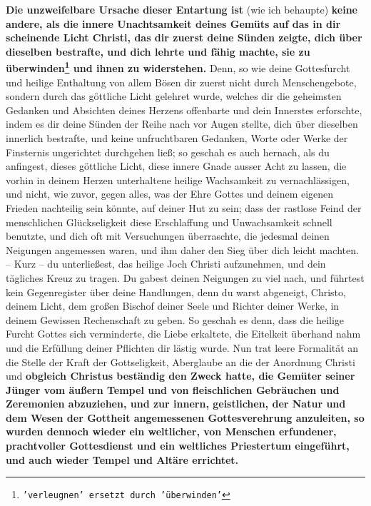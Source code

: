 \label{ref:02_08_ursache_des_abfalls}
\textbf{Die unzweifelbare Ursache dieser Entartung ist} (wie ich behaupte)
\textbf{keine andere,
als die innere Unachtsamkeit deines Gemüts auf das in dir scheinende Licht
Christi, das dir zuerst deine Sünden zeigte, dich über dieselben bestrafte, und
dich lehrte und fähig machte, sie zu überwinden\footnote{\texttt{'verleugnen'
ersetzt durch 'überwinden'}}
und ihnen zu widerstehen.} Denn,
so wie deine Gottesfurcht und heilige Enthaltung von allem Bösen dir zuerst
nicht durch Menschengebote, sondern durch das göttliche Licht gelehret wurde,
welches dir die geheimsten Gedanken und Absichten deines Herzens offenbarte und
dein Innerstes erforschte, indem es dir deine Sünden der Reihe nach vor Augen
stellte, dich über dieselben innerlich bestrafte, und keine unfruchtbaren
Gedanken, Worte oder Werke der Finsternis ungerichtet durchgehen ließ; so
geschah es auch hernach, als du anfingest, dieses göttliche Licht, diese innere
Gnade ausser Acht zu lassen, die vorhin in deinem Herzen unterhaltene heilige
Wachsamkeit zu vernachlässigen, und nicht, wie zuvor, gegen alles, was der Ehre
Gottes und deinem eigenen Frieden nachteilig sein könnte, auf deiner Hut zu
sein; dass der rastlose Feind der menschlichen Glückseligkeit diese
Erschlaffung und Unwachsamkeit schnell benutzte, und dich oft mit Versuchungen
überraschte, die jedesmal deinen Neigungen angemessen waren, und ihm daher den
Sieg über dich leicht machten. -- Kurz -- du unterließest, das heilige Joch
Christi aufzunehmen, und dein tägliches Kreuz zu tragen. Du gabest deinen
Neigungen zu viel nach, und führtest kein Gegenregister über deine Handlungen,
denn du warst abgeneigt, Christo, deinem Licht, dem großen Bischof deiner
Seele und Richter deiner Werke, in deinem Gewissen Rechenschaft zu geben. So
geschah es denn, dass die heilige Furcht Gottes sich verminderte, die Liebe
erkaltete, die Eitelkeit überhand nahm und die Erfüllung deiner Pflichten dir
lästig wurde. Nun trat leere Formalität an die Stelle der Kraft der
Gottseligkeit, Aberglaube an die der Anordnung Christi und
\label{ref:02_08_falscher_gottesdienst} \textbf{obgleich Christus
beständig den Zweck hatte, die Gemüter seiner Jünger vom äußern Tempel und von
fleischlichen Gebräuchen und Zeremonien abzuziehen, und zur innern, geistlichen,
der Natur und dem Wesen der Gottheit angemessenen Gottesverehrung anzuleiten, so
wurden dennoch wieder ein weltlicher, von Menschen erfundener, prachtvoller
Gottesdienst  und ein weltliches Priestertum
 eingeführt, und auch wieder Tempel
und Altäre errichtet.}
